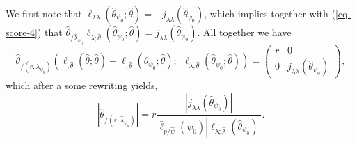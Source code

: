We first note that $\ell_{\lambda\lambda}(\hat\theta_{\psi_0}; \hat\theta) = -j_{\lambda\lambda}(\hat\theta_{\psi_0})$, which implies together with (\ref{eq-score-4}) that $\hat\theta_{/\hat\lambda_{\psi_0}}\ell_{\lambda; \hat\theta}(\hat\theta_{\psi_0}; \hat\theta) = j_{\lambda\lambda}(\hat\theta_{\psi_0})$. All together we have
\begin{equation*}
    \hat\theta_{/(r, \hat\lambda_{\psi_0})} \left(\ell_{;\hat\theta}(\hat\theta; \hat\theta) - \ell_{;\hat\theta}(\hat\theta_{\psi_0}; \hat\theta); \ \ \ell_{\lambda; \hat\theta}(\hat\theta_{\psi_0}; \hat\theta) \right) = 
    \left(\begin{matrix}
        r & 0\\
        0 & j_{\lambda\lambda}(\hat\theta_{\psi_0})
    \end{matrix}\right),
\end{equation*}
which after a some rewriting yields,
\begin{equation*}
    \left| \hat\theta_{/(r, \hat\lambda_{\psi_0})} \right| 
    = r \frac{\left| j_{\lambda\lambda}(\hat\theta_{\psi_0}) \right|}{\bar\ell_{p/\hat\psi}(\psi_0)\left| \ell_{\lambda;\hat\lambda}(\hat\theta_{\psi_0}) \right|}.
\end{equation*}


